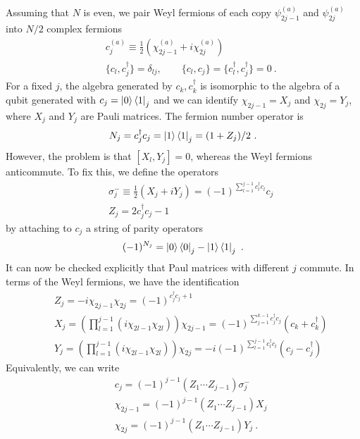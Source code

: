 \documentclass{article}
\theoremstyle{definition}
\newcommand{\nn}{\nonumber}
\newcommand{\lb}{\left(}
\newcommand{\rb}{\right)}
\begin{document}
    Assuming that $N$ is even, we pair Weyl fermions of each copy $\psi^{(a)}_{2j-1}$
    and $\psi^{(a)}_{2j}$ into $N/2$ complex fermions
    \begin{eqnarray}
        &&c_j^{(a)}\equiv \frac{1}{2}(\chi_{2j-1}^{(a)}+i \chi_{2j}^{(a)})\nn\\
        &&\{c_l,c_j^\dagger\}=\delta_{l j},\qquad \{c_l,c_j\}=\{c_l^\dagger,c_j^\dagger\}=0\ .
    \end{eqnarray}
    For a fixed $j$, the algebra generated by $c_{k},c_{k}^{\dagger}$ is
    isomorphic to the algebra of a qubit generated with
    $c_{j}=\ket{0}\bra{1}_{j}$ and we can identify $\chi_{2j-1}=X_{j}$ and
    $\chi_{2j}=Y_{j}$, where $X_{j}$ and $Y_{j}$ are Pauli matrices. The fermion
    number operator is
    \begin{eqnarray}
        N_j=c_j^\dagger c_j=\ket{1}\bra{1}_j=(1+Z_j)/2\ .
    \end{eqnarray}
    However, the problem is that $[X_{l},Y_{j}]=0$, whereas the Weyl fermions
    anticommute. To fix this, we define the operators
    \begin{eqnarray}
        &&\sigma^-_j\equiv \frac{1}{2}(X_j+i Y_j)=(-1)^{\sum_{l=1}^{j-1}c_l^\dagger c_l}c_j\nn\\
        &&Z_j=2c_j^\dagger c_j-1
    \end{eqnarray}
    by attaching to $c_{j}$ a string of parity operators
    \begin{eqnarray}
        (-1)^{N_j}=\ket{0}\bra{0}_j-\ket{1}\bra{1}_j\ .
    \end{eqnarray}
    It can now be checked explicitly that Paul matrices with different $j$
    commute. In terms of the Weyl fermions, we have the identification
    \begin{eqnarray}
        &&Z_j=-i \chi_{2j-1}\chi_{2j}=(-1)^{c_j^\dagger c_j+1}\nn\\
        &&X_j=\lb \prod_{l=1}^{j-1}(i \chi_{2l-1}\chi_{2l})\rb \chi_{2j-1}=(-1)^{\sum_{j=1}^{k-1}c_j^\dagger c_j}(c_k+c_k^\dagger)\nn\\
        &&Y_j=\lb \prod_{l=1}^{j-1}(i \chi_{2l-1}\chi_{2l})\rb \chi_{2j}=-i (-1)^{\sum_{l=1}^{j-1}c_l^\dagger c_l}(c_j-c_j^\dagger)
    \end{eqnarray}
    Equivalently, we can write
    \begin{eqnarray}
        &&c_j=(-1)^{j-1}(Z_1\cdots Z_{j-1})\sigma_j^-\nn\\
        &&\chi_{2j-1}=(-1)^{j-1}(Z_1\cdots Z_{j-1})X_j\nn\\
        &&\chi_{2j}=(-1)^{j-1}(Z_1\cdots Z_{j-1})Y_j\ .
    \end{eqnarray}
\end{document}
